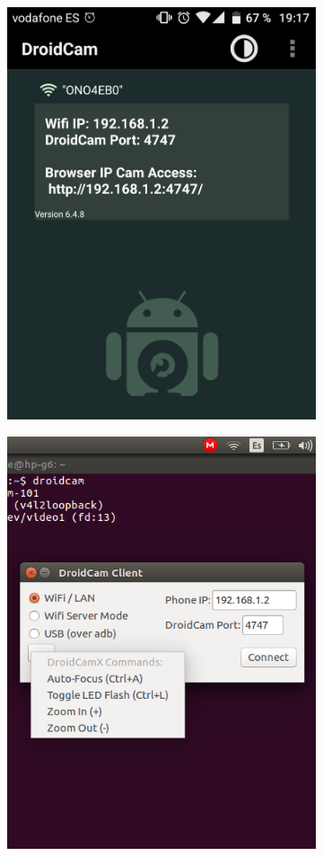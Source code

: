 \begin{figure}
	\centering
	\begin{subfigure}{0.33\textwidth}
		\centering
		\includegraphics[width=0.9\linewidth]{figures/droidcampre.png}
		\caption{}
		\label{fig:droidpre}
	\end{subfigure}%
	\begin{subfigure}{0.33\textwidth}
		\centering
		\includegraphics[width=0.9\linewidth]{figures/droidcamlinux.png}

\end{subfigure}
\end{figure}
